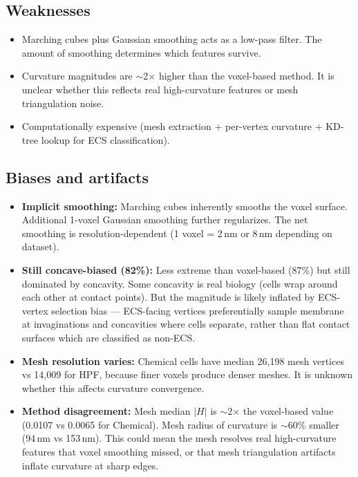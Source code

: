 \documentclass[times, twoside]{zHenriquesLab-StyleBioRxiv}
\begin{document}
\subsection*{Weaknesses}
\begin{itemize}[nosep]
\item Marching cubes plus Gaussian smoothing acts as a low-pass filter. The amount of smoothing determines which features survive.
\item Curvature magnitudes are $\sim$2$\times$ higher than the voxel-based method. It is unclear whether this reflects real high-curvature features or mesh triangulation noise.
\item Computationally expensive (mesh extraction + per-vertex curvature + KD-tree lookup for ECS classification).
\end{itemize}

\subsection*{Biases and artifacts}
\begin{itemize}[nosep]
\item \textbf{Implicit smoothing:} Marching cubes inherently smooths the voxel surface. Additional 1-voxel Gaussian smoothing further regularizes. The net smoothing is resolution-dependent (1 voxel = 2\,nm or 8\,nm depending on dataset).
\item \textbf{Still concave-biased (82\%):} Less extreme than voxel-based (87\%) but still dominated by concavity. Some concavity is real biology (cells wrap around each other at contact points). But the magnitude is likely inflated by ECS-vertex selection bias --- ECS-facing vertices preferentially sample membrane at invaginations and concavities where cells separate, rather than flat contact surfaces which are classified as non-ECS.
\item \textbf{Mesh resolution varies:} Chemical cells have median 26,198 mesh vertices vs 14,009 for HPF, because finer voxels produce denser meshes. It is unknown whether this affects curvature convergence.
\item \textbf{Method disagreement:} Mesh median $|H|$ is $\sim$2$\times$ the voxel-based value (0.0107 vs 0.0065 for Chemical). Mesh radius of curvature is $\sim$60\% smaller (94\,nm vs 153\,nm). This could mean the mesh resolves real high-curvature features that voxel smoothing missed, or that mesh triangulation artifacts inflate curvature at sharp edges.
\end{itemize}
\end{document}
